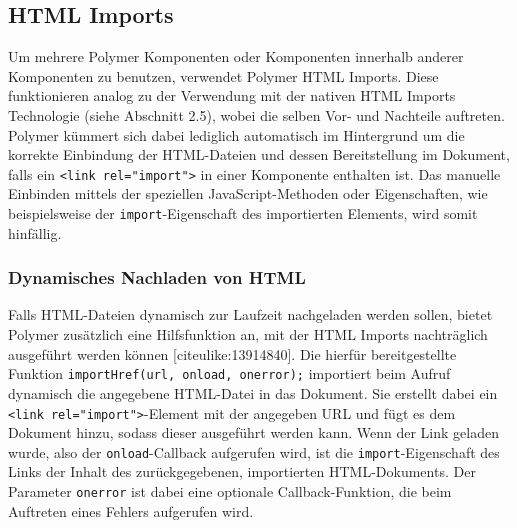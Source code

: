 \documentclass[]{article}
\begin{document}
\subsection{HTML Imports}\label{html-imports}

Um mehrere Polymer Komponenten oder Komponenten innerhalb anderer
Komponenten zu benutzen, verwendet Polymer HTML Imports. Diese
funktionieren analog zu der Verwendung mit der nativen HTML Imports
Technologie (siehe Abschnitt 2.5), wobei die selben Vor- und Nachteile
auftreten. Polymer kümmert sich dabei lediglich automatisch im
Hintergrund um die korrekte Einbindung der HTML-Dateien und dessen
Bereitstellung im Dokument, falls ein
\texttt{\textless{}link\ rel="import"\textgreater{}} in einer Komponente
enthalten ist. Das manuelle Einbinden mittels der speziellen
JavaScript-Methoden oder Eigenschaften, wie beispielsweise der
\texttt{import}-Eigenschaft des importierten Elements, wird somit
hinfällig.

\subsubsection{Dynamisches Nachladen von
HTML}\label{dynamisches-nachladen-von-html}

Falls HTML-Dateien dynamisch zur Laufzeit nachgeladen werden sollen,
bietet Polymer zusätzlich eine Hilfsfunktion an, mit der HTML Imports
nachträglich ausgeführt werden können {[}citeulike:13914840{]}. Die
hierfür bereitgestellte Funktion
\texttt{importHref(url,\ onload,\ onerror);} importiert beim Aufruf
dynamisch die angegebene HTML-Datei in das Dokument. Sie erstellt dabei
ein \texttt{\textless{}link\ rel="import"\textgreater{}}-Element mit der
angegeben URL und fügt es dem Dokument hinzu, sodass dieser ausgeführt
werden kann. Wenn der Link geladen wurde, also der
\texttt{onload}-Callback aufgerufen wird, ist die
\texttt{import}-Eigenschaft des Links der Inhalt des zurückgegebenen,
importierten HTML-Dokuments. Der Parameter \texttt{onerror} ist dabei
eine optionale Callback-Funktion, die beim Auftreten eines Fehlers
aufgerufen wird.
\end{document}
